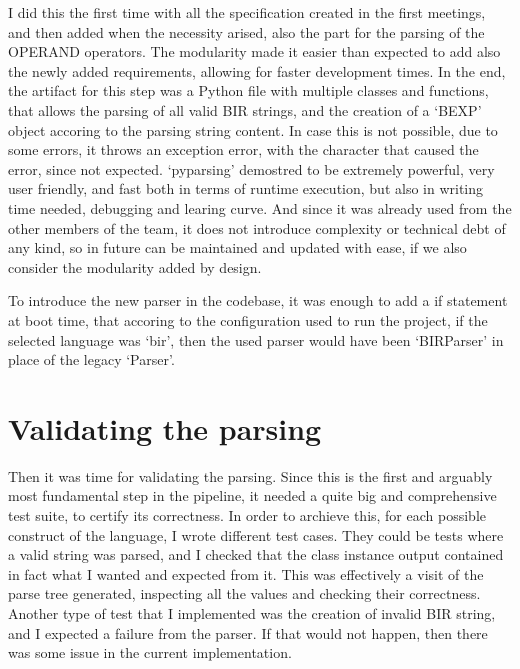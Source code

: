 I did this the first time with all the specification created in the first
meetings, and then added when the necessity arised, also the part for the
parsing of the OPERAND operators. The modularity made it easier than expected to
add also the newly added requirements, allowing for faster development times. In
the end, the artifact for this step was a Python file with multiple classes and
functions, that allows the parsing of all valid BIR strings, and the creation of
a `BEXP' object accoring to the parsing string content. In case this is not possible,
due to some errors, it throws an exception error, with the character that caused
the error, since not expected. `pyparsing' demostred to be extremely powerful, very
user friendly, and fast both in terms of runtime execution, but also in writing time
needed, debugging and learing curve. And since it was already used from the other
members of the team, it does not introduce complexity or technical debt of any
kind, so in future can be maintained and updated with ease, if we also consider
the modularity added by design.

To introduce the new parser in the codebase, it was enough to add a if statement
at boot time, that accoring to the configuration used to run the project, if the
selected language was `bir', then the used parser would have been `BIRParser' in
place of the legacy `Parser'.

\section{Validating the parsing}
\label{cha:Validating the parsing} Then it was time for validating the parsing. Since
this is the first and arguably most fundamental step in the pipeline, it needed
a quite big and comprehensive test suite, to certify its correctness. In order
to archieve this, for each possible construct of the language, I wrote different
test cases. They could be tests where a valid string was parsed, and I checked
that the class instance output contained in fact what I wanted and expected from
it. This was effectively a visit of the parse tree generated, inspecting all the
values and checking their correctness. Another type of test that I implemented was
the creation of invalid BIR string, and I expected a failure from the parser. If
that would not happen, then there was some issue in the current implementation.


